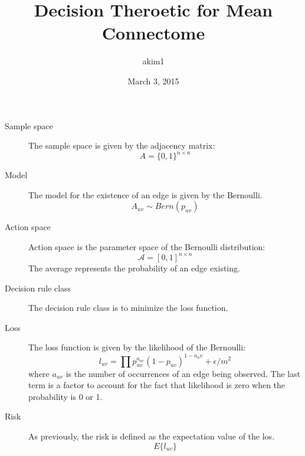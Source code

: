 \documentclass{article}
\title{Decision Theroetic for Mean Connectome}
\author{akim1}
\date{March 3, 2015}
\begin{document}
\maketitle

\begin{description}
\item[Sample space]
The sample space is given by the adjacency matrix:
\begin{equation*}
A=\{0,1\}^{n\times n}
\end{equation*}

\item[Model]
The model for the existence of an edge is given by the Bernoulli.
\begin{equation*}
A_{uv}\sim\mathit{Bern}(p_{uv})
\end{equation*}

\item[Action space]
Action space is the parameter space of the Bernoulli distribution:
\begin{equation*}
\mathscr{A}=[0,1]^{n\times n}
\end{equation*}
The average represents the probability of an edge existing.

\item[Decision rule class]
The decision rule class is to minimize the loss function.

\item[Loss]
The loss function is given by the likelihood of the Bernoulli:
\begin{equation*}
l_{uv}=\prod p_{uv}^{a_{uv}}(1-p_{uv})^{1-a_uv}+\epsilon/m^2
\end{equation*}
where $a_{uv}$ is the number of occurrences of an edge being observed. The last
term is a factor to account for the fact that likelihood is zero when the
probability is 0 or 1.

\item[Risk]
As previously, the risk is defined as the expectation value of the los.
\begin{equation*}
E\{l_{uv}\}
\end{equation*}
\end{description}
\end{document}
